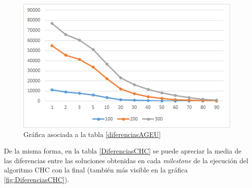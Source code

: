 \begin{figure}
		\centering
		\includegraphics[scale=1]{imagenes/Experimental/DiferenciasAGEU.png}
        \caption{Gráfica asociada a la tabla \ref{diferenciasAGEU}}
        \label{fig:DiferenciasAGEU}
\end{figure}

De la misma forma, en la tabla \ref{DiferenciasCHC} se puede apreciar la media de las diferencias entre las soluciones obtenidas en cada \textit{milestone} de la ejecución del algoritmo CHC con la final (también más visible en la gráfica \ref{fig:DiferenciasCHC}). 

